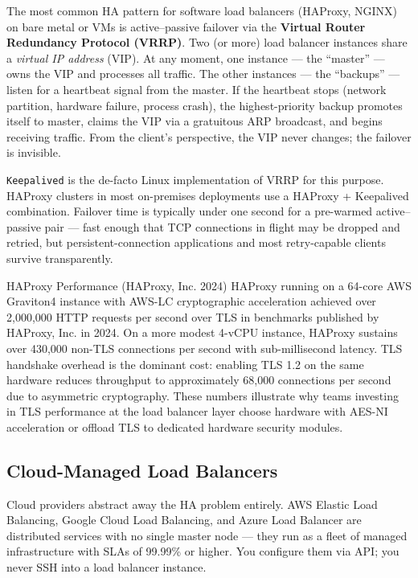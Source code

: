 \documentclass[11pt,a4paper]{article}
\begin{document}
The most common HA pattern for software load balancers (HAProxy, NGINX) on bare metal or VMs is
active--passive failover via the \textbf{Virtual Router Redundancy Protocol (VRRP)}. Two (or more)
load balancer instances share a \emph{virtual IP address} (VIP). At any moment, one instance --- the
``master'' --- owns the VIP and processes all traffic. The other instances --- the ``backups'' ---
listen for a heartbeat signal from the master. If the heartbeat stops (network partition, hardware
failure, process crash), the highest-priority backup promotes itself to master, claims the VIP via a
gratuitous ARP broadcast, and begins receiving traffic. From the client's perspective, the VIP never
changes; the failover is invisible.

\texttt{Keepalived} is the de-facto Linux implementation of VRRP for this purpose. HAProxy clusters
in most on-premises deployments use a HAProxy + Keepalived combination. Failover time is typically
under one second for a pre-warmed active--passive pair --- fast enough that TCP connections in flight
may be dropped and retried, but persistent-connection applications and most retry-capable clients
survive transparently.

\begin{industrybox}{HAProxy Performance (HAProxy, Inc. 2024)}
  HAProxy running on a 64-core AWS Graviton4 instance with AWS-LC cryptographic acceleration
  achieved over 2,000,000 HTTP requests per second over TLS in benchmarks published by HAProxy,
  Inc. in 2024. On a more modest 4-vCPU instance, HAProxy sustains over 430,000 non-TLS
  connections per second with sub-millisecond latency. TLS handshake overhead is the dominant
  cost: enabling TLS 1.2 on the same hardware reduces throughput to approximately 68,000 connections
  per second due to asymmetric cryptography. These numbers illustrate why teams investing in TLS
  performance at the load balancer layer choose hardware with AES-NI acceleration or offload TLS
  to dedicated hardware security modules.
\end{industrybox}

\subsection{Cloud-Managed Load Balancers}

Cloud providers abstract away the HA problem entirely. AWS Elastic Load Balancing, Google Cloud
Load Balancing, and Azure Load Balancer are distributed services with no single master node ---
they run as a fleet of managed infrastructure with SLAs of 99.99\% or higher. You configure them
via API; you never SSH into a load balancer instance.
\end{document}
